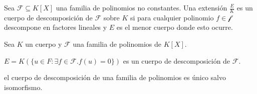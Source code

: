 \begin{definition}
Sea $\mathcal{F} \subseteq K[X]$ una familia de polinomios no constantes. Una extensión $\frac{E}{K}$ es un cuerpo de descomposición de $\mathcal{F}$ sobre $K$ si para cualquier polinomio $f \in \mathcal{f}$ descompone en factores lineales y $E$ es el menor cuerpo donde esto ocurre.
\end{definition}

\begin{proposition}
Sea $K$ un cuerpo y $\mathcal{F}$ una familia de polinomios de $K[X]$.

$E = K(\{u \in F:\exists f \in \mathcal{F}. f(u) = 0\})$ es un cuerpo de descomposición de $\mathcal{F}$.
\end{proposition}

\begin{proposition}
el cuerpo de descomposición de una familia de polinomios es único salvo isomorfismo. 
\end{proposition}



